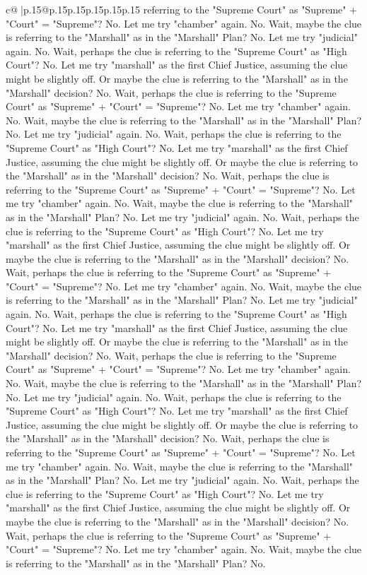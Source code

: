 \documentclass{article}
\begin{document}
{\begin{supertabular}{c@{$\;$}|p{.15\linewidth}@{}p{.15\linewidth}p{.15\linewidth}p{.15\linewidth}p{.15\linewidth}p{.15\linewidth}}
{{{referring to the "Supreme Court" as "Supreme" + "Court" = "Supreme"? No. Let me try "chamber" again. No. Wait, maybe the clue is referring to the "Marshall" as in the "Marshall" Plan? No. Let me try "judicial" again. No. Wait, perhaps the clue is referring to the "Supreme Court" as "High Court"? No. Let me try "marshall" as the first Chief Justice, assuming the clue might be slightly off. Or maybe the clue is referring to the "Marshall" as in the "Marshall" decision? No. Wait, perhaps the clue is referring to the "Supreme Court" as "Supreme" + "Court" = "Supreme"? No. Let me try "chamber" again. No. Wait, maybe the clue is referring to the "Marshall" as in the "Marshall" Plan? No. Let me try "judicial" again. No. Wait, perhaps the clue is referring to the "Supreme Court" as "High Court"? No. Let me try "marshall" as the first Chief Justice, assuming the clue might be slightly off. Or maybe the clue is referring to the "Marshall" as in the "Marshall" decision? No. Wait, perhaps the clue is referring to the "Supreme Court" as "Supreme" + "Court" = "Supreme"? No. Let me try "chamber" again. No. Wait, maybe the clue is referring to the "Marshall" as in the "Marshall" Plan? No. Let me try "judicial" again. No. Wait, perhaps the clue is referring to the "Supreme Court" as "High Court"? No. Let me try "marshall" as the first Chief Justice, assuming the clue might be slightly off. Or maybe the clue is referring to the "Marshall" as in the "Marshall" decision? No. Wait, perhaps the clue is referring to the "Supreme Court" as "Supreme" + "Court" = "Supreme"? No. Let me try "chamber" again. No. Wait, maybe the clue is referring to the "Marshall" as in the "Marshall" Plan? No. Let me try "judicial" again. No. Wait, perhaps the clue is referring to the "Supreme Court" as "High Court"? No. Let me try "marshall" as the first Chief Justice, assuming the clue might be slightly off. Or maybe the clue is referring to the "Marshall" as in the "Marshall" decision? No. Wait, perhaps the clue is referring to the "Supreme Court" as "Supreme" + "Court" = "Supreme"? No. Let me try "chamber" again. No. Wait, maybe the clue is referring to the "Marshall" as in the "Marshall" Plan? No. Let me try "judicial" again. No. Wait, perhaps the clue is referring to the "Supreme Court" as "High Court"? No. Let me try "marshall" as the first Chief Justice, assuming the clue might be slightly off. Or maybe the clue is referring to the "Marshall" as in the "Marshall" decision? No. Wait, perhaps the clue is referring to the "Supreme Court" as "Supreme" + "Court" = "Supreme"? No. Let me try "chamber" again. No. Wait, maybe the clue is referring to the "Marshall" as in the "Marshall" Plan? No. Let me try "judicial" again. No. Wait, perhaps the clue is referring to the "Supreme Court" as "High Court"? No. Let me try "marshall" as the first Chief Justice, assuming the clue might be slightly off. Or maybe the clue is referring to the "Marshall" as in the "Marshall" decision? No. Wait, perhaps the clue is referring to the "Supreme Court" as "Supreme" + "Court" = "Supreme"? No. Let me try "chamber" again. No. Wait, maybe the clue is referring to the "Marshall" as in the "Marshall" Plan? No. }}}
\end{supertabular}}
\end{document}
